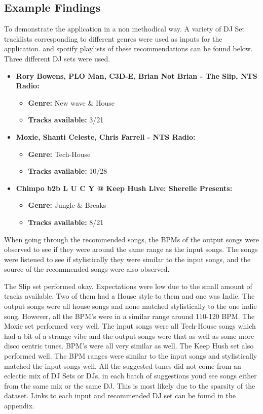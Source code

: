 \subsection{Example Findings}
To demonstrate the application in a non methodical way. A variety of DJ Set tracklists corresponding to different genres were used as inputs for the application. and spotify playlists of these recommendations can be found below.  Three different DJ sets were used.

\begin{itemize}
	\item \textbf{Rory Bowens, PLO Man, C3D-E, Brian Not Brian - The Slip, NTS Radio: } 
	\begin{itemize}
		\item \textbf{Genre:} New wave \& House
		\item \textbf{Tracks available:} 3/21
	\end{itemize}
	\item \textbf{Moxie, Shanti Celeste, Chris Farrell - NTS Radio: } 
	\begin{itemize}
		\item \textbf{Genre:} Tech-House
		\item \textbf{Tracks available:} 10/28
	\end{itemize}
	\item \textbf{Chimpo b2b L U C Y @ Keep Hush Live: Sherelle Presents:}
	\begin{itemize}
		\item \textbf{Genre:} Jungle \& Breaks
		\item \textbf{Tracks available:} 8/21
	\end{itemize}
	
\end{itemize}


When going through the recommended songs, the BPMs of the output songs were observed to see if they were around the same range as the input songs. The songs were listened to see if stylistically they were similar to the input songs, and the source of the recommended songs were also observed.

The Slip set performed okay. Expectations were low due to the small amount of tracks available. Two of them had a House style to them and one was Indie. The output songs were all house songs and none matched stylistically to the one indie song. However, all the BPM's were in a similar range around 110-120 BPM. The Moxie set performed very well. The input songs were all Tech-House songs which had a bit of a strange vibe and the output songs were that as well as some more disco centric tunes. BPM's were all very similar as well. The Keep Hush set also performed well. The BPM ranges were similar to the input songs and stylistically matched the input songs well. All the suggested tunes did not come from an eclectic mix of DJ Sets or DJs, in each batch of suggestions youd see songs either from the same mix or the same DJ. This is most likely due to the sparsity of the dataset. Links to each input and recommended DJ set can be found in the appendix.

